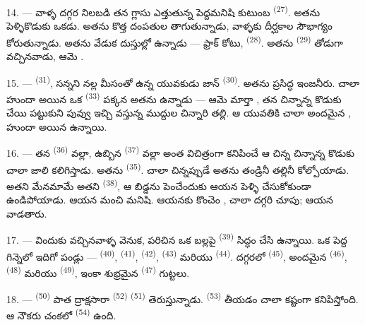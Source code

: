 14. --- వాళ్ళ దగ్గర నిలబడి తన గ్లాసు ఎత్తుతున్న పెద్దమనిషి కుటుంబ 
\textsuperscript{(27)}. అతను పెళ్ళికొడుకు  ఒకడు. అతను
 కొత్త దంపతుల  తాగుతున్నాడు, వాళ్ళకు
దీర్ఘకాల సౌభాగ్యం కోరుతున్నాడు. అతను వేడుక దుస్తుల్లో ఉన్నాడు — ఫ్రాక్ కోటు,
 \textsuperscript{(28)}. అతను  \textsuperscript{(29)}
తోడుగా వచ్చినవాడు, ఆమె .

15. ---  \textsuperscript{(31)}, సన్నని నల్ల మీసంతో ఉన్న యువకుడు జాన్
 \textsuperscript{(30)}. అతను ప్రసిద్ధ ఇంజనీరు. చాలా హుందా అయిన ఒక 
\textsuperscript{(33)} పక్కన అతను ఉన్నాడు — ఆమె మార్తా , తన చిన్నాన్న కొడుకు చేయి
పట్టుకుని పువ్వు ఇచ్చి   వస్తున్న ముద్దుల చిన్నారి
తల్లి. ఆ యువతికి చాలా అందమైన , హుందా అయిన  ఉన్నాయి.

16. --- తన  \textsuperscript{(36)} వల్లా, ఉబ్బిన 
\textsuperscript{(37)} వల్లా అంత విచిత్రంగా కనిపించే ఆ చిన్న చిన్నాన్న కొడుకు చాలా జాలి
కలిగిస్తాడు. అతను  \textsuperscript{(35)}. చాలా చిన్నప్పుడే అతను తండ్రినీ తల్లినీ
కోల్పోయాడు. అతని మేనమామే అతని  \textsuperscript{(38)}, ఆ బిడ్డను పెంచేందుకు
ఆయన పెళ్ళి చేసుకోకుండా ఉండిపోయాడు. ఆయన మంచి మనిషి. ఆయనకు కొంచెం , చాలా దగ్గరి
చూపు; ఆయన  వాడతారు.

\VUsaut{2.4mm}
\VUsaut{3.0mm}

17. --- విందుకు వచ్చినవాళ్ళ వెనుక,  పరిచిన ఒక బల్లపై 
\textsuperscript{(39)} సిద్ధం చేసి ఉన్నాయి. ఒక పెద్ద గిన్నెలో ఇదిగో పండ్లు —
 \textsuperscript{(40)},  \textsuperscript{(41)},
 \textsuperscript{(42)},  \textsuperscript{(43)} మరియు
 \textsuperscript{(44)}. దగ్గరలో  \textsuperscript{(45)},
అందమైన  \textsuperscript{(46)},  \textsuperscript{(48)}
మరియు  \textsuperscript{(49)}, ఇంకా శుభ్రమైన 
\textsuperscript{(47)} గుట్టలు.

18. ---  \textsuperscript{(50)} పాత ద్రాక్షసారా 
\textsuperscript{(52)}  \textsuperscript{(51)} తెరుస్తున్నాడు.
 \textsuperscript{(53)} తీయడం చాలా కష్టంగా కనిపిస్తోంది. ఆ నౌకరు చంకలో
 \textsuperscript{(54)} ఉంది.

